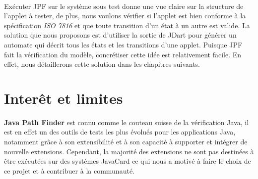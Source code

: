 		\paragraph{}
			Exécuter \gls{JPF} sur le système sous test donne une vue claire sur la structure de l'applet à tester, de plus, nous voulons
			vérifier si l'applet est bien conforme à la spécification \textit{ISO 7816} et que toute transition d'un état à un autre est valide.
			La solution que nous proposons est d'utiliser la sortie de JDart pour générer un automate qui décrit tous les états et les transitions
			d'une applet.
			Puisque \gls{JPF} fait la vérification du modèle, concrétiser cette idée est relativement facile.
			En effet, nous détaillerons cette solution dans les chapitres suivants.
			
	\section{Interêt et limites}
	\paragraph{}
		\textbf{Java Path Finder} est connu comme le couteau suisse de la vérification Java,
		il est en effet un des outils de tests les plus évolués pour les applications Java,
		notamment grâce à son extensibilité et à son capacité à supporter et intégrer de nouvelle extensions.
		Cependant, la majorité des extensions ne sont pas destinées à être exécutées sur des systèmes JavaCard ce qui nous a motivé
		à faire le choix de ce projet et à contribuer à la communauté.